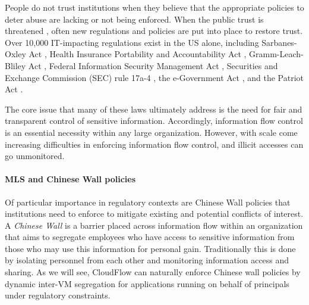 
People do not trust institutions when they believe that the appropriate
policies to deter abuse are lacking or not being enforced.  When the public
trust is threatened \cite{Enron}, often new regulations and policies are put
into place to restore trust.  Over 10,000 IT-impacting regulations exist in
the US alone, including Sarbanes-Oxley Act \cite{Sox}, Health Insurance
Portability and Accountability Act \cite{HIPAA}, Gramm-Leach-Bliley Act
\cite{GLB}, Federal Information Security Management Act \cite{FISMA},
Securities and Exchange Commission (SEC) rule 17a-4 \cite{SEC17cfr241}, the
e-Government Act \cite{EGA}, and the Patriot Act \cite{Pat01}.


The core issue that many of these laws ultimately address is the need for
fair and transparent control of sensitive information.  Accordingly,
information flow control is an essential necessity within any large
organization.  However, with scale come increasing difficulties in enforcing 
information flow control, and illicit accesses can go unmonitored.

\paragraph{\bf MLS and Chinese Wall policies}
%
Of particular importance in regulatory contexts are Chinese Wall policies
that institutions need to enforce to mitigate existing and potential
conflicts of interest.  A \textit{Chinese Wall} is a barrier placed
across information flow within an organization that aims to segregate
employees who have access to sensitive information from those who may
use this information for personal gain.  Traditionally this is
done by isolating personnel from each other and monitoring information
access and sharing.  As we will see, CloudFlow can naturally enforce Chinese
wall policies by dynamic inter-VM segregation for applications running on
behalf of principals under regulatory constraints.

